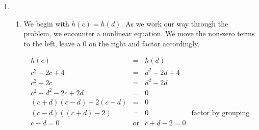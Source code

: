 {\begin{enumerate}
\begin{enumerate}
\[ \begin{array}{rclr}
g(c) & = & g(d) & \\ [3pt]
\dfrac{2c}{1-c} & = & \dfrac{2d}{1-d} & \\ [6pt]
2c(1-d) & = & 2d(1-c) & \\
2c - 2cd & = & 2d - 2dc & \\
2c & = & 2d & \\
c & = & d \, \, \checkmark \\ 
\end{array} \]

We have shown that $g$ is one-to-one.  

\drawexampleline

\item  The graph of $g$ is shown in Figure \ref{fig:inverse6}.  We get the sole intercept at $(0,0)$, a vertical asymptote $x=1$ and a horizontal asymptote (which the graph never crosses) $y = -2$. We see from that the graph of $g$ in Figure \ref{fig:inverse6} that $g$ passes the Horizontal Line Test.

\end{enumerate}


\item  \begin{enumerate} \item  We begin with $h(c) = h(d)$.  As we work our way through the problem, we encounter a nonlinear equation.  We move the non-zero terms to the left, leave a $0$ on the right and factor accordingly.

\[ \begin{array}{rclr}

h(c) & = & h(d) & \\
c^2 - 2c+4 & = & d^2 - 2d+4 & \\

c^2 - 2c & = & d^2 - 2d & \\

c^2 - d^2 - 2c + 2d & = & 0 & \\

(c+d)(c-d) - 2(c-d) & = & 0 & \\

(c-d)((c+d) -2) & = & 0 & \mbox{factor by grouping} \\

c-d = 0 & \mbox{or} & c+d -2 = 0 & \\


\end{array}\]
\end{enumerate}
\end{enumerate}}
